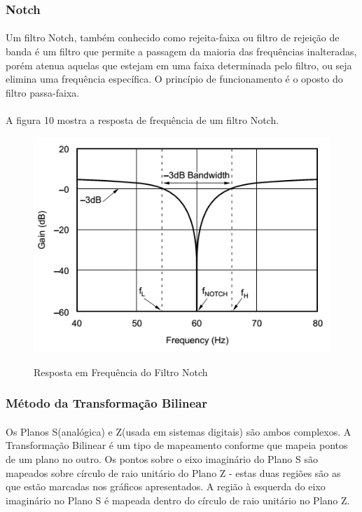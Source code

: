 \documentclass[12pt,fleqn]{article}
\begin{document}
\subsubsection{Notch}
\paragraph{} Um filtro Notch, também conhecido como rejeita-faixa ou filtro de rejeição de banda é um filtro que permite a passagem da maioria das frequências inalteradas, porém atenua aquelas que estejam em uma faixa determinada pelo filtro, ou seja elimina uma frequência específica. O princípio de funcionamento é o oposto do filtro passa-faixa.

\paragraph{} A figura 10 mostra a resposta de frequência de um filtro Notch.

\begin{figure}[!htb]
    \centering
    \includegraphics[scale=0.6]{fig/figura10.png}
    \label{figura:figura6}
    \caption{Resposta em Frequência do Filtro Notch}
\end{figure}

\subsubsection{Método da Transformação Bilinear}
\paragraph{} Os Planos S(analógica) e Z(usada em sistemas digitais) são ambos complexos. A Transformação Bilinear é um tipo de mapeamento conforme que mapeia pontos de um plano no outro. Os pontos sobre o eixo imaginário do Plano S são mapeados sobre círculo de raio unitário do Plano Z - estas duas regiões são as que estão marcadas nos gráficos apresentados. A região à esquerda do eixo imaginário no Plano S é mapeada dentro do círculo de raio unitário no Plano Z.
\end{document}

